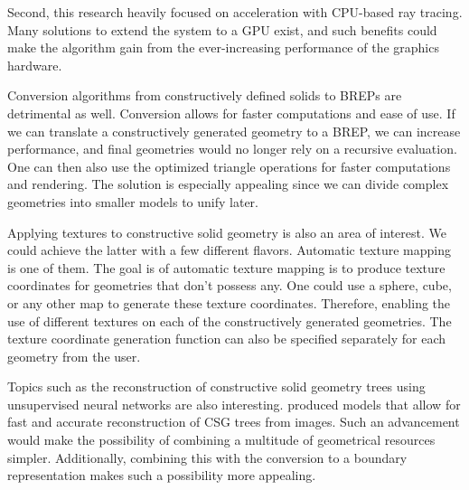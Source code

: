 \documentclass[a4paper,11pt,oneside]{article}
\begin{document}
Second, this research heavily focused on acceleration with CPU-based ray tracing. Many solutions to extend the system to a GPU exist, and such benefits could make the algorithm gain from the ever-increasing performance of the graphics hardware.

Conversion algorithms from constructively defined solids to BREPs are detrimental as well. Conversion allows for faster computations and ease of use. If we can translate a constructively generated geometry to a BREP,  we can increase performance, and final geometries would no longer rely on a recursive evaluation. One can then also use the optimized triangle operations for faster computations and rendering. The solution is especially appealing since we can divide complex geometries into smaller models to unify later.

Applying textures to constructive solid geometry is also an area of interest. We could achieve the latter with a few different flavors. Automatic texture mapping is one of them. The goal is of automatic texture mapping is to produce texture coordinates for geometries that don't possess any. One could use a sphere, cube, or any other map to generate these texture coordinates. Therefore, enabling the use of different textures on each of the constructively generated geometries.	 The texture coordinate generation function can also be specified separately for each geometry from the user.

Topics such as the reconstruction of constructive solid geometry trees using unsupervised neural networks are also interesting. \cite{ucsgnet_ml} produced models that allow for fast and accurate reconstruction of CSG trees from images. Such an advancement would make the possibility of combining a multitude of geometrical resources simpler. Additionally, combining this with the conversion to a boundary representation makes such a possibility more appealing.
  

\newpage
%
%
\printbibliography
\end{document}
